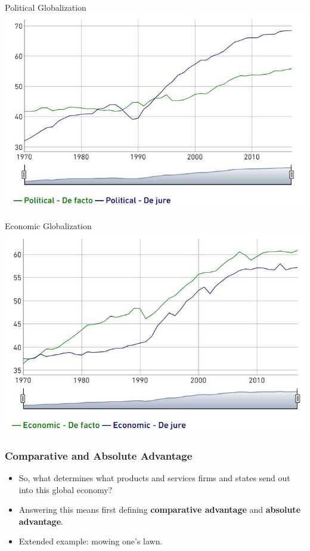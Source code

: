 \documentclass{beamer}
\begin{document}
\begin{frame}{\LARGE Political Globalization}
    \centering
\includegraphics[width=\textwidth,height=0.8\textheight,keepaspectratio]{KOF political.JPG}
\end{frame}


\begin{frame}{\LARGE Economic Globalization}
    \centering
\includegraphics[width=\textwidth,height=0.8\textheight,keepaspectratio]{KOF economic.JPG}
\end{frame}


\begin{frame} 
\frametitle{\LARGE{Comparative and Absolute Advantage}}
\begin{itemize}
    \item So, what determines what products and services firms and states send out into this global economy? 
    \item Answering this means first defining \textbf{comparative advantage} and \textbf{absolute advantage}.
    \item Extended example: mowing one's lawn.
\end{itemize}
\end{frame}
\end{document}
